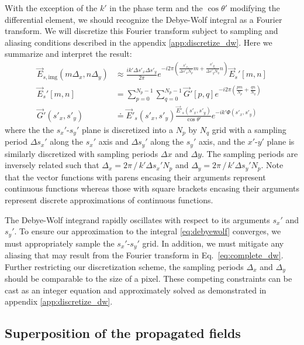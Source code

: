 With the exception of the $k'$ in the phase term and the $\cos{\theta'}$ 
modifying the differential element, we should recognize the
Debye-Wolf integral as a Fourier transform. We will discretize this
Fourier transform subject to sampling and aliasing conditions described
in the appendix \ref{app:discretize_dw}. Here we summarize and interpret the result:
\begin{equation}
  \begin{split}
    \vec{E}_{s,\text{img}}( m \Delta_x, n \Delta_y) & \approx \frac{i k' \Delta s'_x \Delta s'_y}{2 \pi} e^{-i2\pi \left ( \frac{s'_{x_o}}{\Delta s'_x N_p} m + \frac{s'_{y_o}}{\Delta s'_yN_q} n \right ) } \vec{E}_s'\left [ m, n \right ] \\
    \vec{E}_s'\left [ m,n \right ] & = \sum_{p=0}^{N_p-1}\sum_{q=0}^{N_p-1}\vec{G}'\left [p,q\right ] e^{-i2\pi \left ( \frac{pm}{N_p}+\frac{qn}{N_q} \right ) } \\
    \vec{G}'(s'_x,s'_y) & \doteq \vec{E}'_s(s'_x,s'_y)\frac{\vec{E}'_s(s'_x,s'_y)}{\cos{\theta'}}e^{-ik'\Phi(s'_x,s'_y)}
  \end{split}
  \label{eq:complete_dw}
\end{equation}
where the the $s_x'$-$s_y'$ plane is discretized into a
$N_p$ by $N_q$ grid with a sampling period $\Delta s_x'$ along the $s_x'$ axis and
$\Delta s_y'$ along the $s_y'$ axis, and the $x'$-$y'$ plane is similarly discretized with
sampling periods $\Delta x$ and $\Delta y$.
The sampling periods are inversely related such that $\Delta_x = 2\pi \, / \, k' \Delta s_x' N_p$
and $\Delta_y = 2\pi \, / \, k' \Delta s_y' N_p$.
Note that the vector functions with parens encasing their arguments represent
continuous functions whereas those with square brackets encasing their arguments represent
discrete approximations of continuous functions.

The Debye-Wolf integrand rapidly oscillates with respect to its arguments $s_x'$ and $s_y'$.
To ensure our approximation to the integral \eqref{eq:debyewolf} converges, we
must appropriately sample the $s_x'$-$s_y'$ grid. In addition, we must mitigate any
aliasing that may result from the Fourier transform in Eq.~\eqref{eq:complete_dw}.
Further restricting our discretization scheme, the sampling periods $\Delta_x$
and $\Delta_y$ should be comparable to the size of a pixel. These competing constraints
can be cast as an integer equation and approximately solved as demonstrated
in appendix \ref{app:discretize_dw}.

\subsection{Superposition of the propagated fields}

